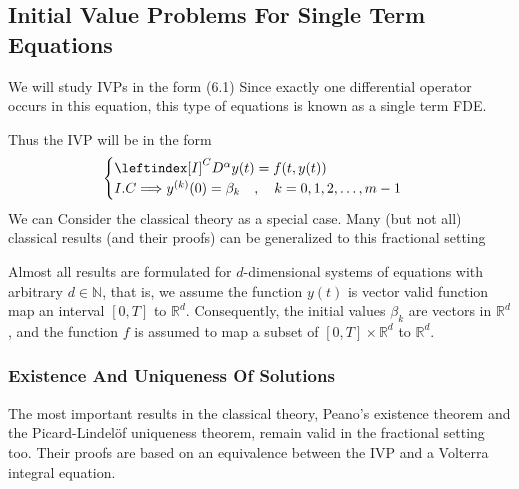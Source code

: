 \subsection{Initial Value Problems For Single Term Equations}
We will study IVPs in the form (6.1)
Since exactly one differential operator occurs in this equation, this type of
equations is known as a single term FDE.

Thus the IVP will be in the form 
\begin{equation}
    \begin{cases}
        \leftindex[I]^C {D^{\alpha}} y(t) = f(t,y(t))
        \\
        I.C \Longrightarrow y^{(k)}(0) = \beta_k \quad,\quad k=0,1,2,\dots,m-1 
    \end{cases}
\end{equation}
We can Consider the classical theory as a special case. 
Many (but not all) classical results (and their proofs) can be generalized to this fractional setting

Almost all results are formulated for $d$-dimensional systems of equations 
with arbitrary $d \in \mathbb{N}$, that is, we assume the function $y(t)$ is vector valid function map an
interval $[0, T]$ to $\mathbb{R}^d$. Consequently, the initial values $\beta_k$ are vectors in $\mathbb{R}^d$, and the
function $f$ is assumed to map a subset of $[0, T]\times\mathbb{R}^d$ to $\mathbb{R}^d$.

\subsubsection{Existence And Uniqueness Of Solutions}
The most important results in the classical theory, Peano's existence theorem and the
Picard-Lindelöf uniqueness theorem, remain valid in the fractional setting too. Their
proofs are based on an equivalence between the IVP and a Volterra
integral equation. 

